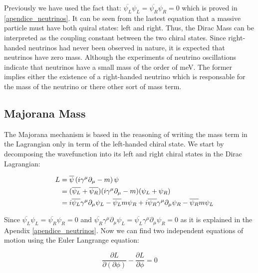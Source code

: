 Previously we have used the fact that: $\overline{\psi_L}\psi_L = \overline{\psi_R}\psi_R = 0$ which is proved in \ref{apendice_neutrinos}. It can be seen from the lastest equation
that a massive particle must have both quiral states: left and right. Thus, the Dirac Mass can be interpreted as the coupling constant between the two chiral states. Since right-handed 
neutrinos had never been observed in nature, it is expected that neutrinos have zero mass. Although the experiments of neutrino oscillations indicate that neutrinos have a small mass of the order of meV. The former implies either the existence of a right-handed neutrino which is responsable for the mass of the neutrino or there other sort of mass term.

\subsection{Majorana Mass}


The Majorana mechanism is based in the reasoning of writing the mass term in the Lagrangian only in term of the left-handed chiral state. We start by decomposing the wavefunction into its left and right chiral states in the Dirac Lagrangian: 


\begin{align}
  \phantom{i = j = k}
  &\begin{aligned}
    \mathllap{L} &= \overline{\psi} \left( i \gamma ^\mu \partial_{\mu} - m \right) \psi \\
    \mathllap{}  &= (\overline{\psi_L} + \overline{\psi_R})( i \gamma ^\mu \partial_{\mu} - m)(\psi_L + \psi_R) \\
     \mathllap{} &= i \overline{\psi_L}\gamma^\mu\partial_\mu \psi_L - \overline{\psi_L} m \psi_R +
     i\overline{\psi_R}\gamma^\mu \partial_\mu \psi_R - \overline{\psi_R}m\psi_L
   &\end{aligned}
\end{align}

Since $\overline{\psi_L}\psi_L = \overline{\psi_R}\psi_R = 0$ and $\overline{\psi_R}\gamma^\mu \partial_\mu \psi_L = \overline{\psi_L}\gamma^\mu\partial_\mu \psi_R = 0$ as it is explained in the Apendix \ref{apendice_neutrinos}. Now we can find two independent equations of motion using the Euler Langrange equation:

\begin{equation}
\frac{\partial L}{\partial (\partial \phi)} - \frac{\partial L}{\partial \phi} = 0
\end{equation}

